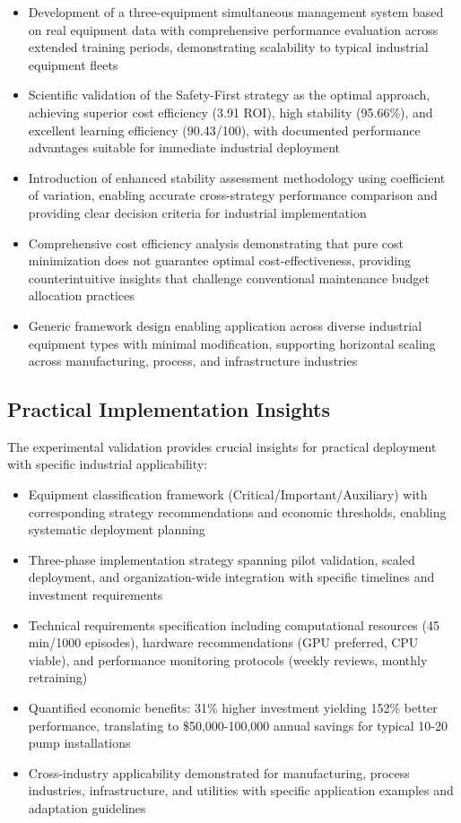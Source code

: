 \documentclass[twocolumn]{article}
\begin{document}
\begin{itemize}
\item Development of a three-equipment simultaneous management system based on real equipment data with comprehensive performance evaluation across extended training periods, demonstrating scalability to typical industrial equipment fleets
\item Scientific validation of the Safety-First strategy as the optimal approach, achieving superior cost efficiency (3.91 ROI), high stability (95.66\%), and excellent learning efficiency (90.43/100), with documented performance advantages suitable for immediate industrial deployment
\item Introduction of enhanced stability assessment methodology using coefficient of variation, enabling accurate cross-strategy performance comparison and providing clear decision criteria for industrial implementation
\item Comprehensive cost efficiency analysis demonstrating that pure cost minimization does not guarantee optimal cost-effectiveness, providing counterintuitive insights that challenge conventional maintenance budget allocation practices
\item Generic framework design enabling application across diverse industrial equipment types with minimal modification, supporting horizontal scaling across manufacturing, process, and infrastructure industries
\end{itemize}

\subsection{Practical Implementation Insights}

The experimental validation provides crucial insights for practical deployment with specific industrial applicability:

\begin{itemize}
\item Equipment classification framework (Critical/Important/Auxiliary) with corresponding strategy recommendations and economic thresholds, enabling systematic deployment planning
\item Three-phase implementation strategy spanning pilot validation, scaled deployment, and organization-wide integration with specific timelines and investment requirements
\item Technical requirements specification including computational resources (45 min/1000 episodes), hardware recommendations (GPU preferred, CPU viable), and performance monitoring protocols (weekly reviews, monthly retraining)
\item Quantified economic benefits: 31\% higher investment yielding 152\% better performance, translating to \$50,000-100,000 annual savings for typical 10-20 pump installations
\item Cross-industry applicability demonstrated for manufacturing, process industries, infrastructure, and utilities with specific application examples and adaptation guidelines
\end{itemize}
\end{document}
